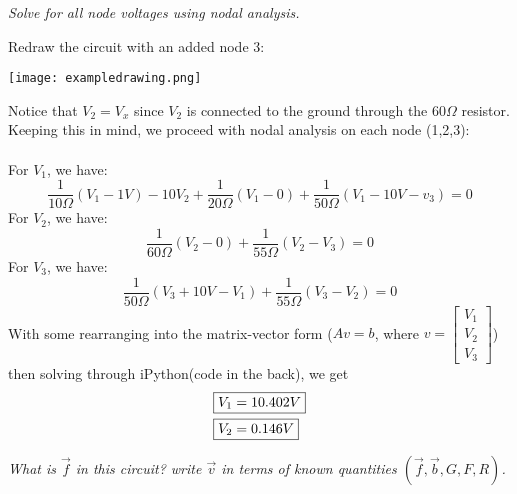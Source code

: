 \documentclass[letter]{article}
\newenvironment{menumerate}{\edef\backupindent{\the\parindent}
  \enumerate\setlength{\parindent}{\backupindent}}
  {\endenumerate}
\begin{document}
\begin{menumerate}
\begin{menumerate}
        \item \emph{Solve for all node voltages using nodal analysis.}

        Redraw the circuit with an added node 3:
        \begin{center}
            \texttt{[image: exampledrawing.png]}
        \end{center}
        Notice that $V_2 = V_x$ since $V_2$ is connected to the ground through the $60\Omega$ resistor. Keeping this in mind, we proceed with nodal analysis on each node (1,2,3):
        \\\\For $V_1$, we have:
        \begin{equation*}
            \frac{1}{10\Omega}(V_1 - 1V) - 10V_2 + \frac{1}{20\Omega}(V_1 - 0) + \frac{1}{50\Omega}(V_1 - 10V - v_3) = 0
        \end{equation*}
        For $V_2$, we have:
        \begin{equation*}
            \frac{1}{60\Omega}(V_2 - 0) + \frac{1}{55\Omega}(V_2 - V_3) = 0
        \end{equation*}
        For $V_3$, we have:
        \begin{equation*}
            \frac{1}{50\Omega}(V_3 + 10V - V_1) + \frac{1}{55\Omega}(V_3 - V_2) = 0
        \end{equation*}
        With some rearranging into the matrix-vector form ($Av = b$, where $v = \begin{bmatrix}
                V_1\\ V_2\\ V_3
            \end{bmatrix}$) then solving through iPython(code in the back), we get
        \begin{align}
            \Aboxed{V_1 &= 10.402V} \\
            \Aboxed{V_2 &= 0.146V}
        \end{align}

        \item \emph{What is $\vec{f}$ in this circuit? write $\vec{v}$ in terms of known quantities $(\vec{f} , \vec{b}, G, F, R)$.}


\end{menumerate}
\end{menumerate}
\end{document}

